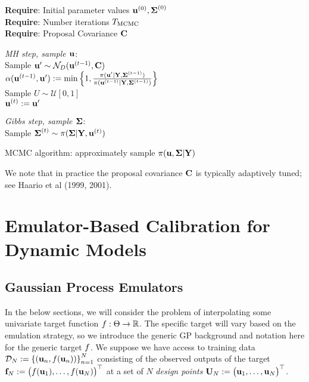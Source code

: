 \documentclass[12pt]{article}
\begin{document}
 \begin{algorithm}[H]
	\SetAlgoLined
	
	\textbf{Require}: Initial parameter values $\bpar^{(0)}, \CovObs^{(0)}$ \\
	\textbf{Require}: Number iterations $\NMCMC$ \\
	\textbf{Require}: Proposal Covariance $\CovProp$
		
	\bigskip
	
	 {
	\textit{MH step, sample $\bpar$}: \\[.2cm]
	Sample $\bpar^\prime \sim \mathcal{N}_{\Npar}(\bpar^{(t - 1)}, \CovProp)$ \\
	$\accProbMH(\bpar^{(t - 1)}, \bpar^\prime) := \min\left\{1, \frac{\postDens(\bpar^\prime|\stateMat, \CovObs^{(t-1)})}{\postDens(\bpar^{(t-1)}|\stateMat, \CovObs^{(t-1)})} \right\}$ \\

	 Sample $U \sim \mathcal{U}[0, 1]$ \\
	  {
	 	$\bpar^{(t)} := \bpar^\prime$ \\
	 } 
	
	\bigskip
	
	\textit{Gibbs step, sample $\CovObs$}: \\[.2cm]
	Sample $\CovObs^{(t)} \sim  \postDens(\CovObs | \stateMat, \bpar^{(t)})$
}
\caption{MCMC algorithm: approximately sample $\postDens(\bpar, \CovObs|\stateMat)$}
\end{algorithm}
We note that in practice the proposal covariance $\CovProp$ is typically adaptively tuned; see Haario et al (1999, 2001).  

\section{Emulator-Based Calibration for Dynamic Models}

\subsection{Gaussian Process Emulators}
In the below sections, we will consider the problem of interpolating some univariate target function $\f: \parSpace \to \R$. The specific target will vary based on the 
emulation strategy, so we introduce the generic GP background and notation here for the generic target $\f$. We suppose we have access to training data 
$\designData_{\Ndesign} := \left\{(\bpar_{\designIdx}, \f(\bpar_{\designIdx}))\right\}_{\designIdx = 1}^{\Ndesign}$ consisting of the observed outputs of the target 
$\fObs[\Ndesign] :=  \begin{pmatrix} \f(\bpar_1), \dots, \f(\bpar_\Ndesign) \end{pmatrix}^\top$ at a set of $N$ 
\textit{design points} $\designMat[\Ndesign] := \begin{pmatrix} \bpar_1, \dots, \bpar_N \end{pmatrix}^\top$. 
\end{document}
